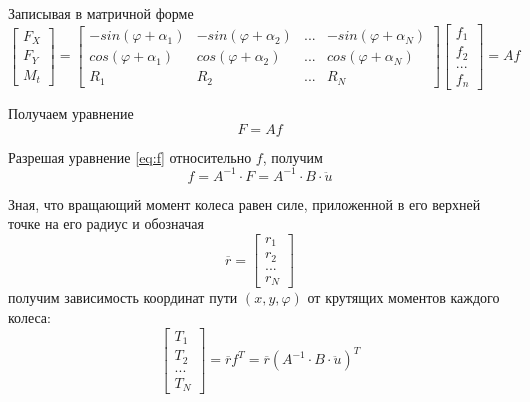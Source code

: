 \documentclass[oneside,final,14pt]{extreport}
\begin{document}
Записывая в матричной форме
\begin{equation}
\begin{bmatrix}
F_{X} \\
F_{Y} \\
M_{t}
\end{bmatrix}
=
\begin{bmatrix}
-sin(\varphi + \alpha_{1}) &
-sin(\varphi + \alpha_{2}) &
... 					   &
-sin(\varphi + \alpha_{N}) \\
cos(\varphi + \alpha_{1}) &
cos(\varphi + \alpha_{2}) &
... 					   &
cos(\varphi + \alpha_{N}) \\ 
R_{1} & R_{2} & ... & R_{N}
\end{bmatrix}
\begin{bmatrix}
f_{1} \\
f_{2} \\
...   \\
f_{n}
\end{bmatrix}
=
Af
\end{equation}

Получаем уравнение
\begin{equation}
F = Af
\label{eq:f}
\end{equation}

Разрешая уравнение \ref{eq:f} относительно $f$, получим
\begin{equation}
f
=
A^{-1}
\cdot
F
=
A^{-1}
\cdot
B 
\cdot
\ddot{u}
\end{equation}

Зная, что вращающий момент колеса равен силе, приложенной в его верхней точке на его радиус и обозначая 
\begin{equation}
\overline{r} 
=
\begin{bmatrix}
r_{1} \\
r_{2} \\
... \\
r_{N}
\end{bmatrix}
\end{equation}
получим зависимость координат пути $(x,y,\varphi)$ от крутящих моментов каждого колеса:
\begin{equation}
\label{eq:dynamic_w_friction}
\begin{bmatrix}
T_{1} \\
T_{2} \\
... \\
T_{N}
\end{bmatrix}
=
\overline{r}
f^{T}
=
\overline{r}
(
A^{-1}
\cdot
B 
\cdot
\ddot{u}
)^{T}
\end{equation}
\end{document}
